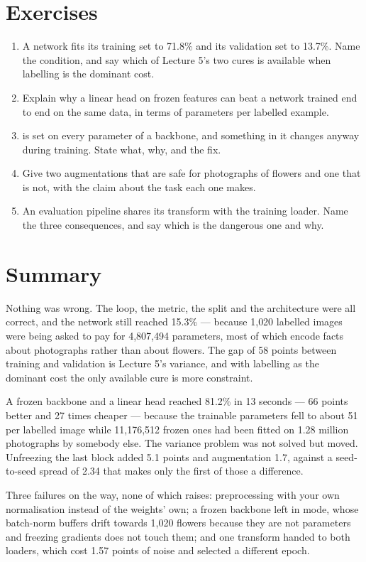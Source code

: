 \documentclass[11pt,a4paper]{article}
\begin{document}
\section{Exercises}

\begin{enumerate}[leftmargin=1.6em,itemsep=4pt]
  \item A network fits its training set to 71.8\% and its validation set to
        13.7\%. Name the condition, and say which of Lecture 5's two cures is
        available when labelling is the dominant cost. \hfill \scope{[4]}
  \item Explain why a linear head on frozen features can beat a network trained
        end to end on the same data, in terms of parameters per labelled
        example. \hfill \scope{[5]}
  \item {} is set on every parameter of a backbone,
        and something in it changes anyway during training. State what, why,
        and the fix. \hfill \scope{[5]}
  \item Give two augmentations that are safe for photographs of flowers and one
        that is not, with the claim about the task each one makes.
        \hfill \scope{[4]}
  \item An evaluation pipeline shares its transform with the training loader.
        Name the three consequences, and say which is the dangerous one and
        why. \hfill \scope{[4]}
\end{enumerate}

\section*{Summary}

Nothing was wrong. The loop, the metric, the split and the architecture were
all correct, and the network still reached 15.3\% --- because 1{,}020 labelled
images were being asked to pay for 4{,}807{,}494 parameters, most of which
encode facts about photographs rather than about flowers. The gap of 58 points
between training and validation is Lecture 5's variance, and with labelling as
the dominant cost the only available cure is more constraint.

A frozen backbone and a linear head reached 81.2\% in 13 seconds --- 66 points
better and 27 times cheaper --- because the trainable parameters fell to about
51 per labelled image while 11{,}176{,}512 frozen ones had been fitted on 1.28
million photographs by somebody else. The variance problem was not solved but
moved. Unfreezing the last block added 5.1 points and augmentation 1.7, against
a seed-to-seed spread of 2.34 that makes only the first of those a difference.

Three failures on the way, none of which raises: preprocessing with your own
normalisation instead of the weights' own; a frozen backbone left in
 mode, whose batch-norm buffers drift towards 1{,}020 flowers
because they are not parameters and freezing gradients does not touch them; and
one transform handed to both loaders, which cost 1.57 points of noise and
selected a different epoch.
\end{document}
